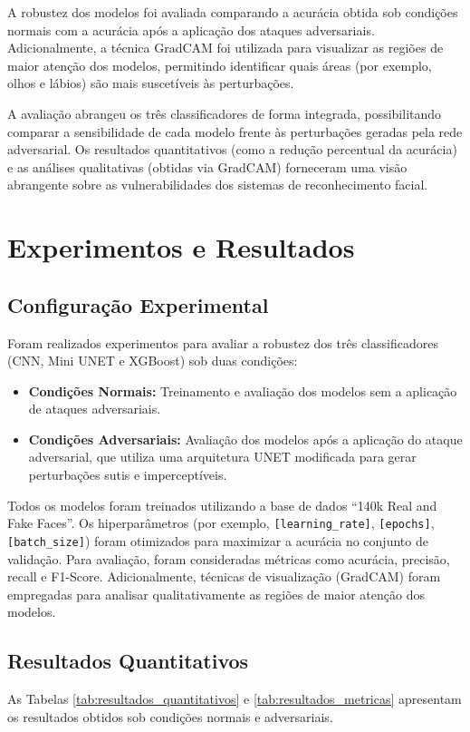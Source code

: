 \documentclass[12pt]{article}
\begin{document}
A robustez dos modelos foi avaliada comparando a acurácia obtida sob condições
normais com a acurácia após a aplicação dos ataques adversariais.
Adicionalmente, a técnica GradCAM foi utilizada para visualizar as regiões de
maior atenção dos modelos, permitindo identificar quais áreas (por exemplo,
olhos e lábios) são mais suscetíveis às perturbações.

A avaliação abrangeu os três classificadores de forma integrada, possibilitando
comparar a sensibilidade de cada modelo frente às perturbações geradas pela
rede adversarial. Os resultados quantitativos (como a redução percentual da
acurácia) e as análises qualitativas (obtidas via GradCAM) forneceram uma visão
abrangente sobre as vulnerabilidades dos sistemas de reconhecimento facial.


\section{Experimentos e Resultados}

\subsection{Configuração Experimental}
Foram realizados experimentos para avaliar a robustez dos três classificadores (CNN, Mini UNET e XGBoost) sob duas condições:
\begin{itemize}
  \item \textbf{Condições Normais:} Treinamento e avaliação dos modelos sem a aplicação de ataques adversariais.
  \item \textbf{Condições Adversariais:} Avaliação dos modelos após a aplicação do ataque adversarial, que utiliza uma arquitetura UNET modificada para gerar perturbações sutis e imperceptíveis.
\end{itemize}

Todos os modelos foram treinados utilizando a base de dados ``140k Real and Fake Faces''. Os hiperparâmetros (por exemplo, \texttt{[learning\_rate]}, \texttt{[epochs]}, \texttt{[batch\_size]}) foram otimizados para maximizar a acurácia no conjunto de validação. Para avaliação, foram consideradas métricas como acurácia, precisão, recall e F1-Score. Adicionalmente, técnicas de visualização (GradCAM) foram empregadas para analisar qualitativamente as regiões de maior atenção dos modelos.

\subsection{Resultados Quantitativos}
As Tabelas \ref{tab:resultados_quantitativos} e \ref{tab:resultados_metricas} apresentam os resultados obtidos sob condições normais e adversariais.
\end{document}
